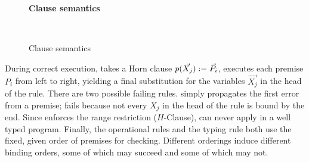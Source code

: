 \documentclass[acmsmall,screen,nonacm]{acmart}
\newcommand{\hdr}[2]{%
\flushleft
\textbf{#1} \hfill {#2} \\
\centering
}
\theoremstyle{definition}
\begin{document}
\begin{figure}[t]
  \hdr{Clause semantics}{ \quad \fbox{$\vec{F}; \world \vdash
    H \stepsto \world_\bot$} }
  
  ~ \\[0.5em]


  
  \caption{Clause semantics}
  \label{fig:opsem-clause}
\end{figure}

During correct execution,  takes a Horn clause
$p(\vec{X_j}) \mathrel{\mathsf{\mathord{:}\mathord{-}}} \vec{P_i}$, executes each premise $P_i$ from left
to right, yielding a final substitution for the variables $\vec{X_j}$
in the head of the rule.
%
There are two possible failing rules.  simply propagates
the first error from a premise;  fails because not every $X_j$ in
the head of the rule is bound by the end.
%
Since \Name enforces the range restriction
($H$-Clause),  can never apply in a well typed program.
%
Finally, the  operational rules and the 
typing rule both use the fixed, given order of premises for
checking. Different orderings induce different binding orders, some of
which may succeed and some of which may not.
\end{document}
